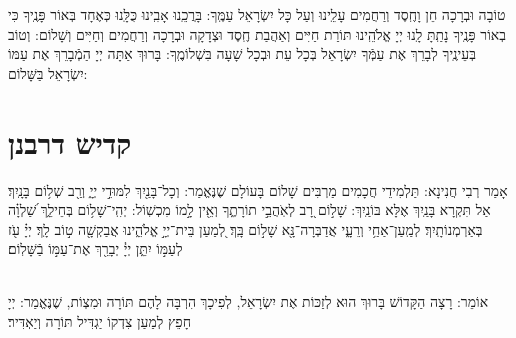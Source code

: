 \documentclass[twoside, openany, parskip=half, 11pt]{book}
\begin{document}
 טוֹבָה וּבְרָכָה חֵן וָחֶֽסֶד וְרַחֲמִים עָלֵֽינוּ וְעַל כָּל יִשְׂרָאֵל עַמֶּֽךָ: בָּרֲכֵֽנוּ אָבִֽינוּ כֻּלָּֽנוּ כְּאֶחָד בְּאוֹר פָּנֶֽיךָ כִּי בְאוֹר פָּנֶֽיךָ נָתַֽתָּ לָֽנוּ יְיָ אֱלֹהֵֽינוּ תּוֹרַת חַיִּים וְאַהֲבַת חֶֽסֶד וּצְדָקָה וּבְרָכָה וְרַחֲמִים וְחַיִּים וְשָׁלוֹם: וְטוֹב בְּעֵינֶֽיךָ לְבָרֵךְ אֶת עַמְּֿךָ יִשְׂרָאֵל בְּכָל עֵת וּבְכָל שָׁעָה בִּשְׁלוֹמֶֽךָ: בָּרוּךְ אַתָּה יְיָ הַמְֿבָרֵךְ אֶת עַמּוֹ יִשְׂרָאֵל בַּשָּׁלוֹם:
 
\tachanunim

\vfill


\sepline


\chapter[קדיש דרבנן]{ קדיש דרבנן }
\label{kaddish derabonan}


  אָמַר רְבִי חֲנִינָא: תַּלְמִידֵי חֲכָמִים מַרְבִּים שָׁלוֹם בָּעוֹלָם שֶׁנֶּאֱמַר: וְכָל־בָּנַ֖יִךְ לִמּוּדֵ֣י יְיָ֑ וְרַ֖ב שְׁל֥וֹם בָּנָֽיִךְ׃ אַל תִּקְרָא בָּנַֽיִךְ אֶלָּא בּוֹנַֽיִךְ: שָׁל֣וֹם רָ֭ב לְאֹֽהֲבֵ֣י תוֹרָתֶ֑ךָ וְאֵ֖ין לָ֣מוֹ מִכְשֽׁוֹל: יְהִֽי־שָׁל֥וֹם בְּחֵילֵ֑ךְ שַׁ֝לְוָ֗ה בְּאַרְמְנוֹתָֽיִךְ׃ לְמַֽעַן־אַחַ֥י וְרֵעָ֑י אֲדַבְּרָה־נָּ֖א שָׁל֣וֹם בָּֽךְ׃ לְ֭מַעַן בֵּית־יְיָ֣ אֱלֹהֵ֑ינוּ אֲבַקְשָׁ֖ה ט֣וֹב לָֽךְ׃ יְיָ֗ עֹ֖ז לְעַמּ֣וֹ יִתֵּ֑ן יְיָ֓  יְבָרֵ֖ךְ אֶת־עַמּ֣וֹ בַֿשָּׁלֽוֹם׃

\\
 אוֹמֵר: רָצָה הַקָּדוֹשׁ בָּרוּךְ הוּא לְזַכּוֹת אֶת יִשְׂרָאֵל, לְפִיכָךְ הִרְבָּה לָהֶם תּוֹרָה וּמִצְוֹת, שֶׁנֶּאֱמַר:
 יְיָ חָפֵץ לְמַעַן צִדְקוֹ יַגְדִּיל תּוֹרָה וְיַאְדִּיר׃
\end{document}
